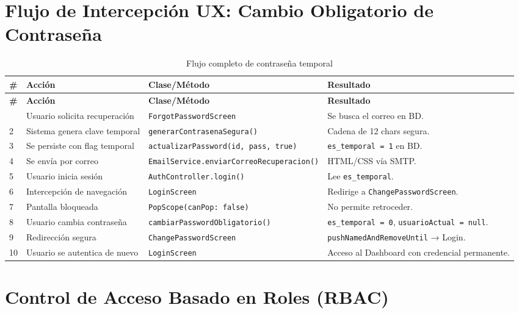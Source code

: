 \documentclass[12pt,a4paper]{article}
\begin{document}
\section{Flujo de Intercepción UX: Cambio Obligatorio de Contraseña}

\begin{longtable}{p{0.5cm} p{4cm} p{4cm} p{5cm}}
\caption{Flujo completo de contraseña temporal} \label{tab:flujo-temp} \\
\toprule
\textbf{\#} & \textbf{Acción} & \textbf{Clase/Método} & \textbf{Resultado} \\
\midrule
\endfirsthead
\toprule
\textbf{\#} & \textbf{Acción} & \textbf{Clase/Método} & \textbf{Resultado} \\
\midrule
\endhead
\bottomrule
\endlastfoot
1 & Usuario solicita recuperación & \texttt{ForgotPasswordScreen} & Se busca el correo en BD. \\
2 & Sistema genera clave temporal & \texttt{generarContrasenaSegura()} & Cadena de 12 chars segura. \\
3 & Se persiste con flag temporal & \texttt{actualizarPassword(id, pass, true)} & \texttt{es\_temporal = 1} en BD. \\
4 & Se envía por correo & \texttt{EmailService.enviarCorreoRecuperacion()} & HTML/CSS vía SMTP. \\
5 & Usuario inicia sesión & \texttt{AuthController.login()} & Lee \texttt{es\_temporal}. \\
6 & Intercepción de navegación & \texttt{LoginScreen} & Redirige a \texttt{ChangePasswordScreen}. \\
7 & Pantalla bloqueada & \texttt{PopScope(canPop: false)} & No permite retroceder. \\
8 & Usuario cambia contraseña & \texttt{cambiarPasswordObligatorio()} & \texttt{es\_temporal = 0}, \texttt{usuarioActual = null}. \\
9 & Redirección segura & \texttt{ChangePasswordScreen} & \texttt{pushNamedAndRemoveUntil} → Login. \\
10 & Usuario se autentica de nuevo & \texttt{LoginScreen} & Acceso al Dashboard con credencial permanente. \\
\end{longtable}

\section{Control de Acceso Basado en Roles (RBAC)}
\end{document}
